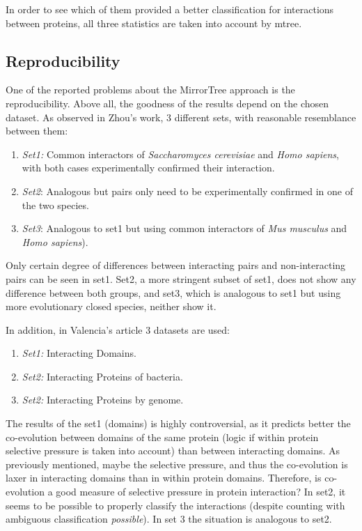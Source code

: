 \documentclass[11pt]{article}
\begin{document}
In order to see which of them provided a better classification for interactions between proteins, all three statistics are taken into account by mtree.

\subsection{Reproducibility}
One of the reported problems about the MirrorTree approach is the reproducibility. Above all, the goodness of the results depend on the chosen dataset. As observed in Zhou's work\cite{Zhou13}, 3 different sets, with reasonable resemblance between them:
\begin{enumerate}
\setlength{\itemsep}{1pt}
	\item \textit{Set1:} Common interactors of \textit{Saccharomyces cerevisiae} and \textit{Homo sapiens}, 		with both cases experimentally confirmed their interaction.
	\item \textit{Set2}: Analogous but pairs only need to be experimentally confirmed in one of the two 			species.
	\item \textit{Set3}: Analogous to set1 but using common interactors of \textit{Mus musculus} and   \textit{Homo sapiens}).
\end{enumerate}
Only certain degree of differences between interacting pairs and non-interacting pairs can be seen in set1. Set2, a more stringent subset of set1, does not show any difference between both groups, and set3, which is analogous to set1 but using more evolutionary closed species, neither show it.

In addition, in Valencia's article\cite{Pazos2001} 3 datasets are used:
\begin{enumerate}
\setlength{\itemsep}{1pt}
	\item \textit{Set1:} Interacting Domains.
	\item \textit{Set2:} Interacting Proteins of bacteria.
	\item \textit{Set2:} Interacting Proteins by genome.
\end{enumerate}
The results of the set1 (domains) is highly controversial, as it predicts better the co-evolution between domains of the same protein (logic if within protein selective pressure is taken into account) than between interacting domains. As previously mentioned, maybe the selective pressure, and thus the co-evolution is laxer in interacting domains than in within protein domains. Therefore, is co-evolution a good measure of selective pressure in protein interaction?
In set2, it seems to be possible to properly classify the interactions (despite counting with ambiguous classification \textit{possible}). In set 3 the situation is analogous to set2.
\end{document}

